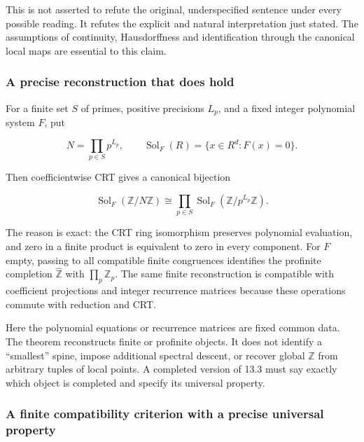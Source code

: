 This is not asserted to refute the original, underspecified sentence
under every possible reading. It refutes the explicit and natural
interpretation just stated. The assumptions of continuity, Hausdorffness
and identification through the canonical local maps are essential to
this claim.

\hypertarget{native:a-precise-reconstruction-that-does-hold}{%
\subsubsection{A precise reconstruction that does
hold}\label{native:a-precise-reconstruction-that-does-hold}}

For a finite set \(S\) of primes, positive precisions \(L_p\), and a
fixed integer polynomial system \(F\), put

\[N=\prod_{p\in S}p^{L_p},\qquad\operatorname{Sol}_F(R)=\{x\in R^d:F(x)=0\}.\]

Then coefficientwise CRT gives a canonical bijection

\[\operatorname{Sol}_F(\mathbb Z/N\mathbb Z)\cong\prod_{p\in S}\operatorname{Sol}_F(\mathbb Z/p^{L_p}\mathbb Z).\]

The reason is exact: the CRT ring isomorphism preserves polynomial
evaluation, and zero in a finite product is equivalent to zero in every
component. For \(F\) empty, passing to all compatible finite congruences
identifies the profinite completion \(\widehat{\mathbb Z}\) with
\(\prod_p\mathbb Z_p\). The same finite reconstruction is compatible
with coefficient projections and integer recurrence matrices because
these operations commute with reduction and CRT.

Here the polynomial equations or recurrence matrices are fixed common
data. The theorem reconstructs finite or profinite objects. It does not
identify a ``smallest'' spine, impose additional spectral descent, or
recover global \(\mathbb Z\) from arbitrary tuples of local points. A
completed version of 13.3 must say exactly which object is completed and
specify its universal property.

\hypertarget{native:a-finite-compatibility-criterion-with-a-precise-universal-property}{%
\subsubsection{A finite compatibility criterion with a precise universal
property}\label{native:a-finite-compatibility-criterion-with-a-precise-universal-property}}

